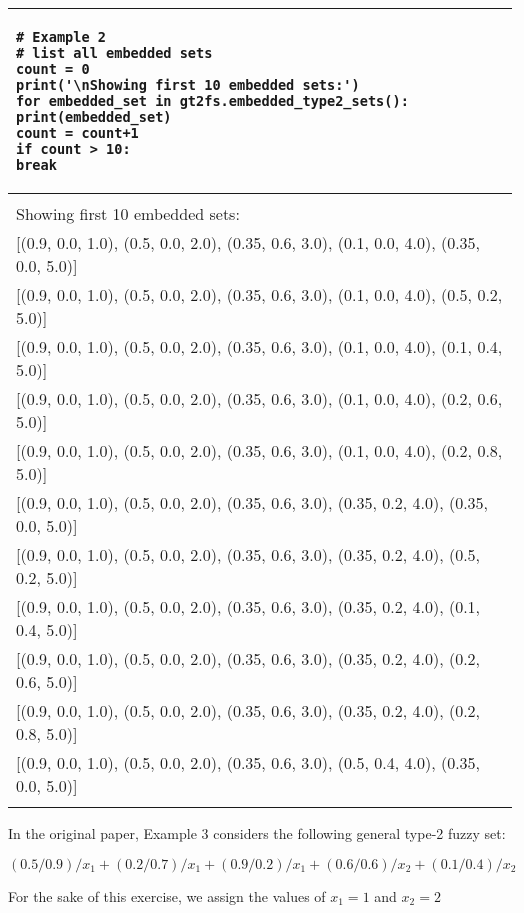 \documentclass[]{article}
\begin{document}
\begin{tabular}{|l|}
\hline 
\lstset{language=Python}
\lstset{basicstyle=\scriptsize}
\begin{lstlisting}
# Example 2
# list all embedded sets
count = 0
print('\nShowing first 10 embedded sets:')
for embedded_set in gt2fs.embedded_type2_sets():
print(embedded_set)
count = count+1
if count > 10:
break
\end{lstlisting}
\\
\hline
\\
{\small Showing first 10 embedded sets:}\\
{\small [(0.9, 0.0, 1.0), (0.5, 0.0, 2.0), (0.35, 0.6, 3.0), (0.1, 0.0, 4.0), (0.35, 0.0, 5.0)]}\\
{\small [(0.9, 0.0, 1.0), (0.5, 0.0, 2.0), (0.35, 0.6, 3.0), (0.1, 0.0, 4.0), (0.5, 0.2, 5.0)]}\\
{\small [(0.9, 0.0, 1.0), (0.5, 0.0, 2.0), (0.35, 0.6, 3.0), (0.1, 0.0, 4.0), (0.1, 0.4, 5.0)]}\\
{\small [(0.9, 0.0, 1.0), (0.5, 0.0, 2.0), (0.35, 0.6, 3.0), (0.1, 0.0, 4.0), (0.2, 0.6, 5.0)]}\\
{\small [(0.9, 0.0, 1.0), (0.5, 0.0, 2.0), (0.35, 0.6, 3.0), (0.1, 0.0, 4.0), (0.2, 0.8, 5.0)]}\\
{\small [(0.9, 0.0, 1.0), (0.5, 0.0, 2.0), (0.35, 0.6, 3.0), (0.35, 0.2, 4.0), (0.35, 0.0, 5.0)]}\\
{\small [(0.9, 0.0, 1.0), (0.5, 0.0, 2.0), (0.35, 0.6, 3.0), (0.35, 0.2, 4.0), (0.5, 0.2, 5.0)]}\\
{\small [(0.9, 0.0, 1.0), (0.5, 0.0, 2.0), (0.35, 0.6, 3.0), (0.35, 0.2, 4.0), (0.1, 0.4, 5.0)]}\\
{\small [(0.9, 0.0, 1.0), (0.5, 0.0, 2.0), (0.35, 0.6, 3.0), (0.35, 0.2, 4.0), (0.2, 0.6, 5.0)]}\\
{\small [(0.9, 0.0, 1.0), (0.5, 0.0, 2.0), (0.35, 0.6, 3.0), (0.35, 0.2, 4.0), (0.2, 0.8, 5.0)]}\\
{\small [(0.9, 0.0, 1.0), (0.5, 0.0, 2.0), (0.35, 0.6, 3.0), (0.5, 0.4, 4.0), (0.35, 0.0, 5.0)]}\\
\\
\hline 
\end{tabular} 

\bigskip

In the original paper, Example 3 considers the following general type-2 fuzzy set:

\[
(0.5/0.9)/x_1 + (0.2/0.7)/x_1 + (0.9/0.2)/x_1 + (0.6/0.6)/x_2 + (0.1/0.4)/x_2
\]

For the sake of this exercise, we assign the values of $x_1 = 1$ and $x_2=2$
\end{document}
